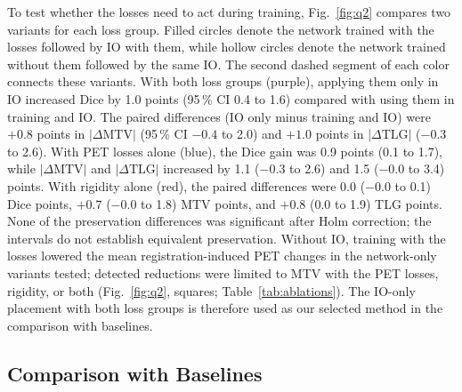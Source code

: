 To test whether the losses need to act during training, Fig.~\ref{fig:q2} compares two variants for each loss group.
Filled circles denote the network trained with the losses followed by IO with them, while hollow circles denote the network trained without them followed by the same IO.
The second dashed segment of each color connects these variants.
With both loss groups (purple), applying them only in IO increased Dice by 1.0 points (95\,\% CI 0.4 to 1.6) compared with using them in training and IO.
The paired differences (IO only minus training and IO) were $+0.8$ points in $|\Delta\mathrm{MTV}|$ (95\,\% CI $-0.4$ to 2.0) and $+1.0$ points in $|\Delta\mathrm{TLG}|$ ($-0.3$ to 2.6).
With PET losses alone (blue), the Dice gain was 0.9 points (0.1 to 1.7), while $|\Delta\mathrm{MTV}|$ and $|\Delta\mathrm{TLG}|$ increased by 1.1 ($-0.3$ to 2.6) and 1.5 ($-0.0$ to 3.4) points.
With rigidity alone (red), the paired differences were 0.0 ($-0.0$ to 0.1) Dice points, $+0.7$ ($-0.0$ to 1.8) MTV points, and $+0.8$ (0.0 to 1.9) TLG points.
None of the preservation differences was significant after Holm correction; the intervals do not establish equivalent preservation.
Without IO, training with the losses lowered the mean registration-induced PET changes in the network-only variants tested; detected reductions were limited to MTV with the PET losses, rigidity, or both (Fig.~\ref{fig:q2}, squares; Table~\ref{tab:ablations}).
The IO-only placement with both loss groups is therefore used as our selected method in the comparison with baselines.



\subsection{Comparison with Baselines}
\label{sect:res_baselines}


